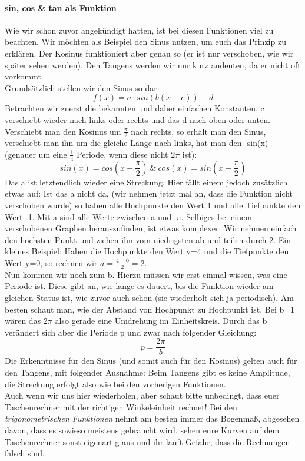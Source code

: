 		\paragraph{sin, cos \& tan als Funktion}
			Wie wir schon zuvor angekündigt hatten, ist bei diesen Funktionen viel zu
			beachten. Wir möchten als Beispiel den Sinus nutzen, um euch das Prinzip zu
			erklären. Der Kosinus funktioniert aber genau so (er ist nur verschoben, wie
			wir später sehen werden). Den Tangens werden wir nur kurz andeuten, da er
			nicht oft vorkommt.\\
			Grundsätzlich stellen wir den Sinus so dar:
			\[f(x)=a\cdot sin(b(x-c))+d\]	
			Betrachten wir zuerst die bekannten und daher einfachen Konstanten. c
			verschiebt wieder nach links oder rechts und das d nach oben oder unten.
			Verschiebt man den Kosinus um \(\frac{\pi}{2}\) nach rechts, so erhält man
			den Sinus, verschiebt man ihn um die gleiche Länge nach links, hat man den
			-sin(x) (genauer um eine \(\frac{1}{4}\) Periode, wenn diese nicht \(2 \pi\)
			ist):
			\[sin(x)=cos(x-\frac{\pi}{2})\ \&\ cos(x)=sin(x+\frac{\pi}{2})\]
			 Das a ist letztendlich wieder eine Streckung. Hier fällt einem jedoch
			 zusätzlich etwas auf: Ist das a nicht da, (wir nehmen jetzt mal an, dass die
			 Funktion nicht verschoben wurde) so haben alle Hochpunkte den Wert 1 und
			 alle Tiefpunkte den Wert -1. Mit a sind alle Werte zwischen a und -a.
			 Selbiges bei einem verschobenen Graphen herauszufinden, ist etwas komplexer.
			 Wir nehmen einfach den höchsten Punkt und ziehen ihn vom niedrigsten ab und
			 teilen durch 2. Ein kleines Beispiel: Haben die Hochpunkte den Wert y=4 und
			 die Tiefpunkte den Wert y=0, so rechnen wir \(a=\frac{4-0}{2}=2\).\\
 			Nun kommen wir noch zum b. Hierzu müssen wir erst einmal wissen, was eine
 			Periode ist. Diese gibt an, wie lange es dauert, bis die Funktion wieder am
			 gleichen Status ist, wie zuvor auch schon (sie wiederholt sich ja
			 periodisch).
			 Am besten schaut man, wie der Abstand von Hochpunkt zu Hochpunkt ist. Bei
			 b=1 wären das \(2\pi\) also gerade eine Umdrehung im Einheitskreis. Durch
			 das b verändert sich aber die Periode p und zwar nach folgender Gleichung:
 			\[p=\frac{2\pi}{b}\]
			 Die Erkenntnisse für den Sinus (und somit auch für den Kosinus) gelten auch
 			für den Tangens, mit folgender Ausnahme: Beim Tangens gibt es keine
 			Amplitude, die Streckung erfolgt also wie bei den vorherigen Funktionen.\\
 			Auch wenn wir uns hier wiederholen, aber schaut bitte unbedingt, dass euer
 			Taschenrechner mit der richtigen Winkeleinheit rechnet! Bei den
 			\textit{trigonometrischen Funktionen} nehmt am besten immer das Bogenmaß,
 			abgesehen davon, dass es sowieso meistens gebraucht wird, sehen eure Kurven
 			auf dem Taschenrechner sonst eigenartig aus und ihr lauft Gefahr, dass die
 			Rechnungen falsch sind.


